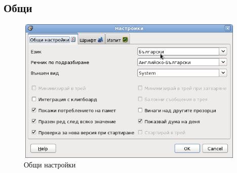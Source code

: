 \subsection{Общи}
\begin{figure}[htbp]
  \caption{Общи настройки}
  \centering
  \includegraphics[width=110mm, height=70mm]{images/general_preferences.png}
\end{figure}

